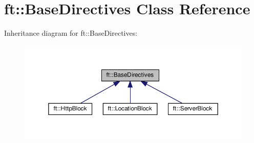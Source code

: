 \hypertarget{classft_1_1BaseDirectives}{}\section{ft\+:\+:Base\+Directives Class Reference}
\label{classft_1_1BaseDirectives}


Inheritance diagram for ft\+:\+:Base\+Directives\+:\nopagebreak
\begin{figure}[H]
\begin{center}
\leavevmode
\includegraphics[width=350pt]{classft_1_1BaseDirectives__inherit__graph}
\end{center}
\end{figure}
